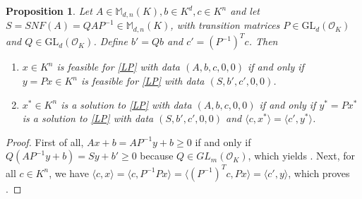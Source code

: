 \documentclass[a4paper,12pt]{article}
\newtheorem{proposition}[theorem]{Proposition}
\newcommand{\allmat}{\mathbb{M}} %
\newcommand{\OK}{\mathcal{O}_K}
\newcommand{\GL}{\mathrm{GL}}
\begin{document}
\begin{proposition} \label{solsLP}
  Let $A \in \allmat_{d,n}(K), b \in K^d, c\in K^n$ and let $S = SNF(A) = QAP^{-1} \in \allmat_{d,n}(K)$, with
  transition matrices $P \in \GL_d(\OK)$ and $Q\in \GL_d(\OK)$. Define $b' = Qb$ and $c' = (P^{-1})^Tc$.
  Then
   \begin{enumerate}
   \item \label{solsLP_item1}
     $x \in K^n$ is feasible for \eqref{LP} with data $(A,b,c,0,0)$ if and only if $y = P x \in K^n$ is
     feasible for \eqref{LP} with data $(S,b',c',0,0)$.
   \item \label{solsLP_item2}
     $x^* \in K^n$ is a solution to \eqref{LP} with data $(A,b,c,0,0)$ if and only if $y^* = P x^*$ is
     a solution to \eqref{LP} with data $(S,b',c',0,0)$ and $\langle c,x^* \rangle = \langle c',y^* \rangle$.
   \end{enumerate}
\end{proposition}
\begin{proof}
  First of all, $Ax+b = AP^{-1}y +b \geq 0$ if and only if $Q(AP^{-1}y + b) = Sy + b' \geq 0$ because
  $Q \in GL_m(\OK)$, which yields . Next, for all $c \in K^n$, we have $\langle c,
  x\rangle = \langle c, P^{-1}Px \rangle = \langle \left(P^{-1}\right)^T c, Px \rangle = \langle c',y\rangle$,
  which proves .
\end{proof}
\end{document}
